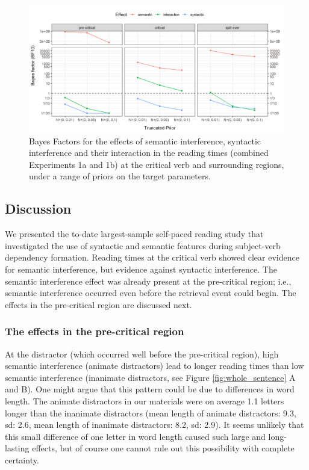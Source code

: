 \documentclass[a4paper, man, floatsintext]{apa7}
\begin{document}
\begin{figure}[H]
    \caption{Bayes Factors for the effects of semantic interference, syntactic interference and their interaction in the reading times (combined Experiments 1a and 1b) at the critical verb and surrounding regions, under a range of priors on the target parameters.}
    \label{fig:spr_bfs}
    \centering
    \includegraphics[width=\textwidth]{images/BF_plot_spr_774_allregions.png}
\end{figure}

\subsection{Discussion}
We presented the to-date largest-sample self-paced reading study that investigated the use of syntactic and semantic features during subject-verb dependency formation. Reading times at the critical verb showed clear evidence for semantic interference, but evidence against syntactic interference. The semantic interference effect was already present at the pre-critical region; i.e., semantic interference occurred even before the retrieval event could begin. The effects in the pre-critical region are discussed next.

\subsubsection{The effects in the pre-critical region}

At the distractor (which occurred well before the pre-critical region), high semantic interference (animate distractors) lead to longer reading times than low semantic interference (inanimate distractors, see Figure \ref{fig:whole_sentence} A and B). One might argue that this pattern could be due to differences in word length. The animate distractors in our materials were on average 1.1 letters longer than the inanimate distractors (mean length of animate distractors: 9.3, sd: 2.6, mean length of inanimate distractors: 8.2, sd: 2.9). It seems unlikely that this small difference of one letter in word length caused such large and long-lasting effects, but of course one cannot rule out this possibility with complete certainty.
\end{document}
